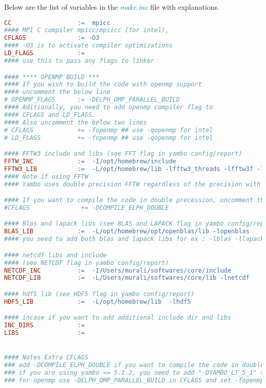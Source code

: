 \documentclass[12pt,twoside,openany]{book}
\begin{document}
Below are the list of variables in the {\textcolor{teal}{\emph{make.inc}}} file with 
explanations.
\begin{lstlisting}[language=make]
CC                  :=  mpicc
#### MPI C compiler mpicc/mpiicc (for intel), 
CFLAGS              := -O3
#### -O3 is to activate compiler optimizations
LD_FLAGS            := 
#### use this to pass any flags to linker

#### **** OPENMP BUILD ***
#### If you wish to build the code with openmp support
#### uncomment the below line 
# OPENMP_FLAGS   	:= -DELPH_OMP_PARALLEL_BUILD 
#### Aditionally, you need to add openmp compiler flag to 
#### CFLAGS and LD_FLAGS.
#### Also uncomment the below two lines
# CFLAGS            += -fopenmp ## use -qopenmp for intel
# LD_FLAGS          += -fopenmp ## use -qopenmp for intel

#### FFTW3 include and libs (see FFT flag in yambo config/report)
FFTW_INC 	        :=  -I/opt/homebrew/include 
FFTW3_LIB           :=  -L/opt/homebrew/lib -lfftw3_threads -lfftw3f -lfftw3f_omp -lfftw3_omp -lfftw3
#### Note if using FFTW
#### Yambo uses double precision FFTW regardless of the precision with which Yambo is built. In contrast, you need to link single (double) precision FFTW for single (double) precision LetzElPhC. please refer to https://www.fftw.org/fftw3_doc/Precision.html . Also you refer to https://www.fftw.org/fftw3_doc/Multi_002dthreaded-FFTW.html  if compiling with openmp support.

#### If you want to compile the code in double precession, uncomment the below
#CFLAGS              += -DCOMPILE_ELPH_DOUBLE 

#### Blas and lapack libs (see BLAS and LAPACK flag in yambo config/report)
BLAS_LIB 	        :=  -L/opt/homebrew/opt/openblas/lib -lopenblas 
#### you need to add both blas and lapack libs for ex : -lblas -llapack

#### netcdf libs and include
#### (see NETCDF flag in yambo config/report)
NETCDF_INC          :=  -I/Users/murali/softwares/core/include 
NETCDF_LIB 	        :=  -L/Users/murali/softwares/core/lib -lnetcdf

#### hdf5 lib (see HDF5 flag in yambo config/report)
HDF5_LIB            :=  -L/opt/homebrew/lib  -lhdf5

#### incase if you want to add additional include dir and libs
INC_DIRS            := 
LIBS                := 


#### Notes Extra CFLAGS
### add -DCOMPILE_ELPH_DOUBLE if you want to compile the code in double precession
### if you are using yambo <= 5.1.2, you need to add "-DYAMBO_LT_5_1" to cflags
### for openmp use -DELPH_OMP_PARALLEL_BUILD in CFLAGS and set -fopenmp in LD_FLAGS and CFLAGS
\end{lstlisting}
\end{document}
